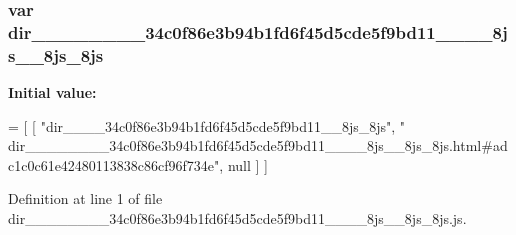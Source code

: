 \subsubsection[{dir\+\_\+\+\_\+\+\_\+\+\_\+\+\_\+\+\_\+\+\_\+\+\_\+34c0f86e3b94b1fd6f45d5cde5f9bd11\+\_\+\+\_\+\+\_\+\+\_\+8js\+\_\+\+\_\+8js\+\_\+8js}]{\setlength{\rightskip}{0pt plus 5cm}var dir\+\_\+\+\_\+\+\_\+\+\_\+\+\_\+\+\_\+\+\_\+\+\_\+34c0f86e3b94b1fd6f45d5cde5f9bd11\+\_\+\+\_\+\+\_\+\+\_\+8js\+\_\+\+\_\+8js\+\_\+8js}\label{dir________________34c0f86e3b94b1fd6f45d5cde5f9bd11________8js____8js__8js_8js_afe622094c2a2599f7b6ee6128dc4ff6f}
{\bfseries Initial value\+:}
\begin{DoxyCode}
=
[
    [ \textcolor{stringliteral}{"dir\_\_\_\_34c0f86e3b94b1fd6f45d5cde5f9bd11\_\_8js\_8js"}, \textcolor{stringliteral}{"
      dir\_\_\_\_\_\_\_\_34c0f86e3b94b1fd6f45d5cde5f9bd11\_\_\_\_8js\_\_8js\_8js.html#adc1c0c61e42480113838c86cf96f734e"}, null ]
]
\end{DoxyCode}


Definition at line 1 of file dir\+\_\+\+\_\+\+\_\+\+\_\+\+\_\+\+\_\+\+\_\+\+\_\+34c0f86e3b94b1fd6f45d5cde5f9bd11\+\_\+\+\_\+\+\_\+\+\_\+8js\+\_\+\+\_\+8js\+\_\+8js.\+js.

